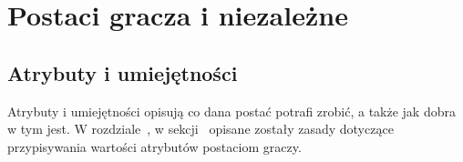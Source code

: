 \chapter{Postaci gracza i niezależne}
\label{ch:character}

\section{Atrybuty i umiejętności}
Atrybuty i umiejętności opisują co dana postać potrafi zrobić, a także jak dobra
w tym jest. W rozdziale~, w
sekcji~ opisane zostały zasady dotyczące
przypisywania wartości atrybutów postaciom graczy.









